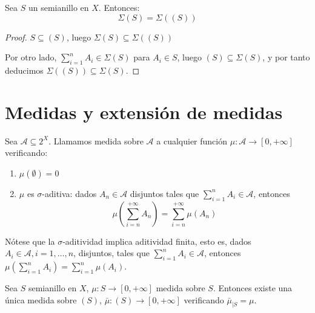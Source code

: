 \begin{fact}
 Sea $S$ un semianillo en $X$. Entonces:
 \[
   \Sigma(S) = \Sigma((S))
 \]
\end{fact}

  \begin{proof}
   $S\subseteq (S)$, luego $\Sigma(S) \subseteq \Sigma((S))$
   
   Por otro lado, $\sum_{i=1}^n A_i \in \Sigma(S)$ para $A_i \in S$, luego $(S) \subseteq \Sigma(S)$, y por tanto
   deducimos $\Sigma((S)) \subseteq \Sigma(S)$.
  \end{proof}
  

\section{Medidas y extensión de medidas}

\begin{definition}[Medida]
 Sea $\mathcal{A} \subseteq 2^X$. Llamamos medida sobre $\mathcal{A}$ a cualquier función 
 $\mu: \mathcal{A} \rightarrow [0, +\infty]$ verificando:

 \begin{enumerate}[i]
  \item $\mu(\emptyset) = 0$
  \item $\mu$ es $\sigma$-aditiva: dados $A_n \in \mathcal{A}$ disjuntos tales que $\sum_{i=1}^n A_i \in \mathcal{A}$, 
  entonces 
  \[
    \mu\left(\sum_{i=n}^{+\infty} A_n \right)= \sum_{i=n}^{+\infty} \mu(A_n)
  \]
 \end{enumerate}
\end{definition}

Nótese que la $\sigma$-aditividad implica aditividad finita, esto es, dados $A_i \in \mathcal{A}, i=1, \ldots, n$,
disjuntos, tales que $\sum_{i=1}^n A_i \in \mathcal{A}$, entonces $\mu\left(\sum_{i=1}^{n} A_i \right)= \sum_{i=1}^{n} \mu(A_i)$.

\begin{theorem}
 Sea $S$ semianillo en $X$, $\mu: S \rightarrow [0,+\infty]$ medida sobre $S$. Entonces existe una única medida 
 sobre $(S)$, $\bar{\mu}: (S) \rightarrow [0,+\infty]$ verificando $\bar{\mu}_{|S} = \mu$.
 
 \label{th:ext-semitoring}
\end{theorem}

